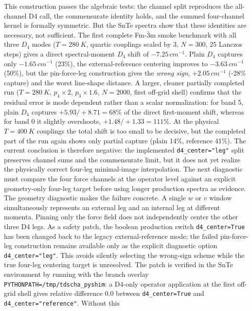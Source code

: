 \documentclass[11pt,a4paper]{article}
\begin{document}
This construction passes the algebraic tests: the channel split reproduces
the all-channel D4 call, the commensurate identity holds, and the summed
four-channel kernel is formally symmetric.  But the SnTe spectra show that
these identities are necessary, not sufficient.  The first
complete Fm-$\bar 3$m smoke benchmark with all three $D_4$ modes
($T=\SI{280}{K}$, quartic couplings scaled by $3$, $N=300$, 25 Lanczos
steps) gives a direct spectral-moment $D_4$ shift of
$-7.25\,\si{cm^{-1}}$.  Plain $D_4$ captures only
$-1.65\,\si{cm^{-1}}$ (23\%), the external-reference centering improves to
$-3.63\,\si{cm^{-1}}$ (50\%), but the pin-force-leg construction gives the
\emph{wrong sign}, $+2.05\,\si{cm^{-1}}$ (-28\% capture) and the worst
line-shape distance.  A larger, cleaner partially completed run
($T=\SI{280}{K}$, $p_4{\times}2$, $p_3{\times}1.6$, $N=2000$, first
off-grid shell) confirms that the residual error is mode dependent rather
than a scalar normalization: for band 5, plain $D_4$ captures
$+5.93/+8.71=68\%$ of the direct first-moment shift, whereas for band 0 it
slightly overshoots, $+1.48/+1.33=111\%$.  At the physical $T=\SI{400}{K}$
couplings the total shift is too small to be decisive, but the completed
part of the run again shows only partial capture (plain 14\%, reference
41\%).  The current conclusion is therefore negative: the implemented
\texttt{d4\_center="leg"} split preserves channel sums and the
commensurate limit, but it does not yet realize the physically correct
four-leg minimal-image interpolation.  The next diagnostic must compare the
four force channels at the operator level against an explicit geometry-only
four-leg target before using longer production spectra as evidence.
The geometry diagnostic makes the failure concrete.  A single $w$ or $v$
window simultaneously represents an external leg and an internal leg at
different momenta.  Pinning only the force field does not independently
center the other three D4 legs.
As a safety patch, the boolean production switch
\texttt{d4\_center=True} has been changed back to the legacy
external-reference mode; the failed pin-force-leg construction remains
available only as the explicit diagnostic option
\texttt{d4\_center="leg"}.  This avoids silently selecting the wrong-sign
scheme while the true four-leg centering target is unresolved.  The patch
is verified in the SnTe environment by running with the branch overlay
\texttt{PYTHONPATH=/tmp/tdscha\_pyshim}: a D4-only operator application at
the first off-grid shell gives relative difference $0.0$ between
\texttt{d4\_center=True} and \texttt{d4\_center="reference"}.  Without this
\end{document}
